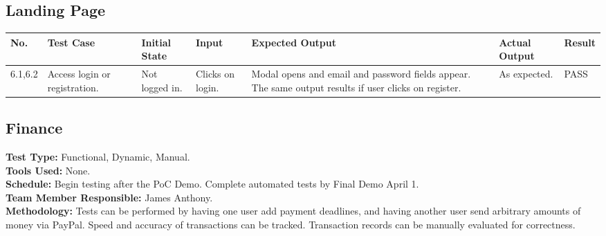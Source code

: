 \documentclass[12pt]{article}
\begin{document}


\subsection{Landing Page}

\begin{longtable}{|p{1.5cm}|p{1.5cm}|p{1.5cm}|p{2cm}|p{4cm}|p{2cm}|p{1.5cm}|}
\hline
\textbf{No.} & \textbf{Test Case}  & \textbf{Initial State} & \textbf{Input} & \textbf{Expected Output} & \textbf{Actual Output} & \textbf{Result}\\ 
\hline
6.1,6.2 & Access login or registration. & Not logged in. & Clicks on login. & Modal opens and email and password fields appear. The same output results if user clicks on register. & As expected. & PASS \\
\hline
\end{longtable}


\subsection{Finance}
\textbf{Test Type:} Functional, Dynamic, Manual. \\
\textbf{Tools Used:} None. \\
\textbf{Schedule:} Begin testing after the PoC Demo. Complete automated tests by Final Demo April 1. \\
\textbf{Team Member Responsible:} James Anthony. \\
\textbf{Methodology:} Tests can be performed by having one user add payment deadlines, and having another user send arbitrary amounts of money via PayPal. Speed and accuracy of transactions can be tracked. Transaction records can be manually evaluated for correctness.
\end{document}
